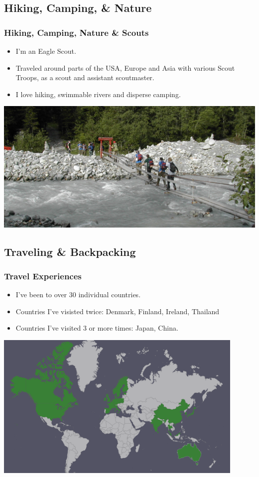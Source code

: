 \documentclass{beamer}
\begin{document}
		\subsection{Hiking, Camping, \& Nature}
\begin{frame}
	\frametitle{Hiking, Camping, Nature \& Scouts}
	\begin{itemize}
		\item I'm an Eagle Scout.  
		\item Traveled around parts of the USA, Europe and Asia with various Scout Troops, as a scout and assistant scoutmaster.
		\item I love hiking, swimmable rivers and disperse camping.
	\end{itemize}
	\begin{center}
		\includegraphics[width = 1.0\textwidth]{images/scouts.png}
	\end{center}
\end{frame}
	
		\subsection{Traveling \& Backpacking}
\begin{frame}
	\frametitle{Travel Experiences}
	\begin{itemize}
		\item I've been to over 30 individual countries.
		\item Countries I've visisted twice:  Denmark, Finland, Ireland, Thailand
		\item Countries I've visited 3 or more times:  Japan, China.
	\end{itemize}
	\begin{center}
		\includegraphics[width = 0.9\textwidth]{images/countries visited.png}
	\end{center}
\end{frame}
\end{document}
